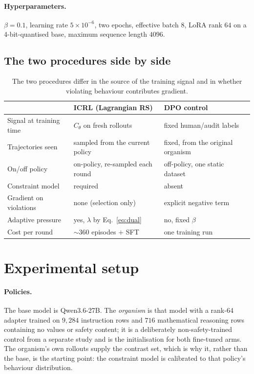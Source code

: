 \documentclass[11pt]{article}
\newcommand{\Cth}{C_{\theta}}
\begin{document}
\paragraph{Hyperparameters.} $\beta = 0.1$, learning rate $5 \times 10^{-6}$, two epochs,
effective batch $8$, LoRA rank $64$ on a 4-bit-quantised base, maximum sequence length
$4096$.

\subsection{The two procedures side by side}

\begin{table}[h]
\centering
\small
\begin{tabular}{lll}
\toprule
& \textbf{ICRL (Lagrangian RS)} & \textbf{DPO control} \\
\midrule
Signal at training time & $\Cth$ on fresh rollouts & fixed human/audit labels \\
Trajectories seen & sampled from the current policy & fixed, from the original organism \\
On/off policy & on-policy, re-sampled each round & off-policy, one static dataset \\
Constraint model & required & absent \\
Gradient on violations & none (selection only) & explicit negative term \\
Adaptive pressure & yes, $\lambda$ by Eq.~\eqref{eq:dual} & no, fixed $\beta$ \\
Cost per round & $\sim$360 episodes $+$ SFT & one training run \\
\bottomrule
\end{tabular}
\caption{The two procedures differ in the source of the training signal and in whether
violating behaviour contributes gradient.}
\end{table}

\section{Experimental setup}
\label{sec:setup}

\paragraph{Policies.} The base model is Qwen3.6-27B. The \emph{organism} is that model
with a rank-64 adapter trained on $9{,}284$ instruction rows and $716$ mathematical
reasoning rows containing no values or safety content; it is a deliberately
non-safety-trained control from a separate study and is the initialisation for both
fine-tuned arms. The organism's own rollouts supply the contrast set, which is why it,
rather than the base, is the starting point: the constraint model is calibrated to that
policy's behaviour distribution.
\end{document}
